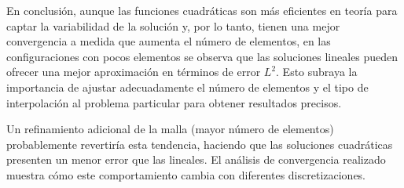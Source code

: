 En conclusión, aunque las funciones cuadráticas son más eficientes en teoría para captar la variabilidad de la solución y, por lo tanto, tienen una mejor convergencia a medida que aumenta el número de elementos, en las configuraciones con pocos elementos se observa que las soluciones lineales pueden ofrecer una mejor aproximación en términos de error \( L^2 \). Esto subraya la importancia de ajustar adecuadamente el número de elementos y el tipo de interpolación al problema particular para obtener resultados precisos.

Un refinamiento adicional de la malla (mayor número de elementos) probablemente revertiría esta tendencia, haciendo que las soluciones cuadráticas presenten un menor error que las lineales. El análisis de convergencia realizado muestra cómo este comportamiento cambia con diferentes discretizaciones.
